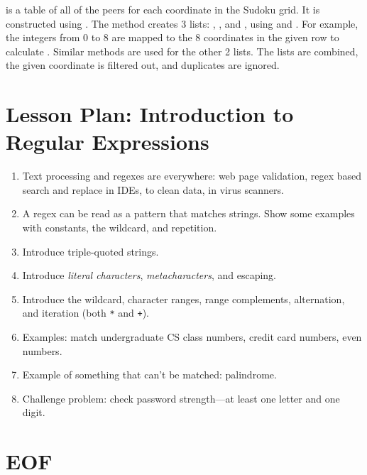 \documentclass[9pt]{extbook}
\begin{document}
 is a table of all of the peers for each
coordinate in the Sudoku grid.  It is constructed using
. The  method creates 3
lists: , , and
, using  and
. For example, the integers from 0 to 8 are mapped
to the 8 coordinates in the given row to calculate
. Similar methods are used for the other 2 lists.
The lists are combined, the given coordinate is filtered out, and
duplicates are ignored.

\chapter{Lesson Plan: Introduction to Regular Expressions}

\begin{enumerate}

  \item Text processing and regexes are everywhere: web page validation, regex
  based search and replace in IDEs, to clean data, in virus scanners.

  \item A regex can be read as a pattern that matches strings. Show some
  examples with constants, the wildcard, and repetition.

  \item Introduce triple-quoted strings.

  \item Introduce \emph{literal characters}, \emph{metacharacters}, and
  escaping.

  \item Introduce the wildcard, character ranges, range complements, alternation,
  and iteration (both \texttt{*} and \texttt{+}).

  \item Examples: match undergraduate CS class numbers, credit card numbers,
  even numbers.

  \item Example of something that can't be matched: palindrome.

  \item Challenge problem: check password strength---at least one letter
  and one digit.

\end{enumerate}


\chapter{EOF}
\end{document}
